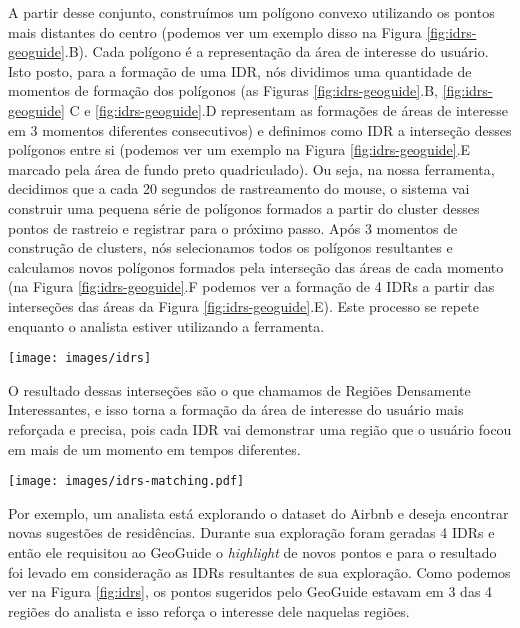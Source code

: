 A partir desse conjunto, construímos um polígono convexo utilizando os pontos mais distantes do centro (podemos ver um exemplo disso na Figura \ref{fig:idrs-geoguide}.B). Cada polígono é a representação da área de interesse do usuário. Isto posto, para a formação de uma IDR, nós dividimos uma quantidade de momentos de formação dos polígonos (as Figuras \ref{fig:idrs-geoguide}.B, \ref{fig:idrs-geoguide} C e \ref{fig:idrs-geoguide}.D representam as formações de áreas de interesse em 3 momentos diferentes consecutivos) e definimos como IDR a interseção desses polígonos entre si (podemos ver um exemplo na Figura \ref{fig:idrs-geoguide}.E marcado pela área de fundo preto quadriculado). Ou seja, na nossa ferramenta, decidimos que a cada 20 segundos de rastreamento do mouse, o sistema vai construir uma pequena série de polígonos formados a partir do cluster desses pontos de rastreio e registrar para o próximo passo. Após 3 momentos de construção de clusters, nós selecionamos todos os polígonos resultantes e calculamos novos polígonos formados pela interseção das áreas de cada momento (na Figura \ref{fig:idrs-geoguide}.F podemos ver a formação de 4 IDRs a partir das interseções das áreas da Figura \ref{fig:idrs-geoguide}.E). Este processo se repete enquanto o analista estiver utilizando a ferramenta.

\begin{figure*}[t]
	\centering
	\texttt{[image: images/idrs]}
	\caption{Figura do processo de construção de IDRs}
	\label{fig:idrs-geoguide}
	\vspace{-10pt}
\end{figure*}

O resultado dessas interseções são o que chamamos de Regiões Densamente Interessantes, e isso torna a formação da área de interesse do usuário mais reforçada e precisa, pois cada IDR vai demonstrar uma região que o usuário focou em mais de um momento em tempos diferentes.

\begin{figure*}[t]
	\centering
	\texttt{[image: images/idrs-matching.pdf]}
	\caption{Figura das sugestões do GeoGuide relacionadas com as IDRs do analista}
	\label{fig:idrs}
	\vspace{-10pt}
\end{figure*}

Por exemplo, um analista está explorando o dataset do Airbnb e deseja encontrar novas sugestões de residências. Durante sua exploração foram geradas 4 IDRs e então ele requisitou ao GeoGuide o \textit{highlight} de novos pontos e para o resultado foi levado em consideração as IDRs resultantes de sua exploração. Como podemos ver na Figura \ref{fig:idrs}, os pontos sugeridos pelo GeoGuide estavam em 3 das 4 regiões do analista e isso reforça o interesse dele naquelas regiões.

